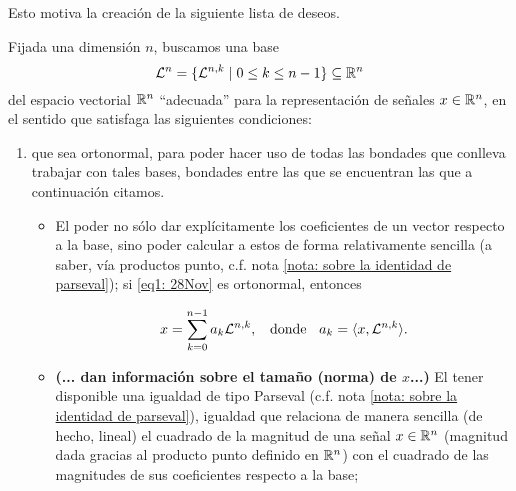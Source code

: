 Esto motiva la
creación de la siguiente lista de deseos.


\noindent 
\begin{listaObj}
\label{lista de objetivos}
Fijada una dimensión $n$, 
buscamos una base 
\begin{equation}
\label{eq1: 28Nov}
\mathcal{L}^{n}=\{ \mathcal{L}^{n,k} \hspace{0.1cm} |
\hspace{0.1cm} 0 \leq k \leq n-1  \} \subseteq \mathbb{R}^{n} 
\end{equation}
del espacio vectorial
$\mathbb{R}^{n}$ ``adecuada'' para la representación de señales
$x \in \mathbb{R}^{n}$,
en el sentido que satisfaga
las siguientes condiciones: 

\begin{enumerate}
\item 
que
sea ortonormal, para poder hacer uso de todas
las bondades que conlleva 
trabajar con tales bases, 
bondades entre las que se encuentran
las que a continuación citamos.
\begin{itemize}
\item 
\textbf{}
El poder no sólo dar explícitamente los coeficientes
de un vector respecto a la base, 
sino poder calcular a estos
de forma relativamente sencilla (a saber, vía productos punto,
c.f. nota \ref{nota: sobre la identidad de parseval}); si
\eqref{eq1: 28Nov} es ortonormal, entonces

\begin{equation}
\label{eq2: 13Feb}
x= \sum\limits_{k=0}^{n-1}a_{k}\mathcal{L}^{n,k},
\hspace{0.2cm} \text{ donde } \hspace{0.2cm}
a_{k}= \langle x , \mathcal{L}^{n,k} \rangle.
\end{equation}
\item
\textbf{\textcolor{ameMorado}{(... dan información sobre el tamaño (norma) de $x$...)}}
El tener disponible una igualdad de tipo Parseval
(c.f. nota \ref{nota: sobre la identidad de parseval}), igualdad que
relaciona de manera sencilla (de hecho, lineal)
el cuadrado de
la magnitud de una señal $x \in \mathbb{R}^{n}$ (magnitud dada
gracias al producto punto definido en $\mathbb{R}^{n}$)
con el cuadrado de las magnitudes de sus coeficientes
respecto a la base;


\end{itemize}
\end{enumerate}
\end{listaObj}
